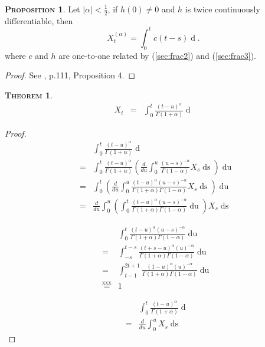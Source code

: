 \documentclass[a4paper, twoside, 11pt]{article}
\theoremstyle{definition}
\newtheorem{theorem}[definition]{\scshape Theorem}
\newtheorem{proposition}[definition]{\scshape Proposition}
\newcommand{\brkt}[1]{\left({#1} \right)}
\begin{document}
\begin{proposition}
  Let $|\alpha| < \frac{1}{2}$, if $h(0) \neq 0$ and $h$ is twice continuously differentiable, then 
  $$X^{(\alpha)}_t = \int_0^t c(t-s) \mathop{dB_s}.$$
  where $c$ and $h$ are one-to-one related by (\ref{sec:frac2}) and (\ref{sec:frac3}).
\end{proposition}
\begin{proof}
  See  \cite{core}, p.111, Proposition 4.
  \end{proof}
  \begin{theorem}
	\begin{eqnarray}
	X_t &=& \int_0^t \frac{(t-u)^\alpha}{\Gamma(1+\alpha)}\mathop{dX^{(\alpha)}_u}
	\label{sec:imp}
  \end{eqnarray}
  \end{theorem}
  \begin{proof}
  \begin{eqnarray*}
	&&\int_0^t \frac{(t-u)^\alpha}{\Gamma(1+\alpha)}\mathop{dX^{(\alpha)}_u}\\
	&=& \int_0^t \frac{(t-u)^\alpha}{\Gamma(1+\alpha)} \brkt{\frac{d}{du} \int_0^u \frac{(u-s)^{-\alpha}}{\Gamma(1-\alpha)}X_s\mathop{ds}}\mathop{du}\\
	&=& \int_0^t \brkt{\frac{d}{du} \int_0^u \frac{(t-u)^\alpha(u-s)^{-\alpha}}{\Gamma(1+\alpha)\Gamma(1-\alpha)}X_s\mathop{ds}}\mathop{du}\\
	&=& \frac{d}{du}\int_0^u \brkt{\int_0^t \frac{(t-u)^\alpha(u-s)^{-\alpha}}{\Gamma(1+\alpha)\Gamma(1-\alpha)}\mathop{du}} X_s \mathop{ds}
  \end{eqnarray*}

  \begin{eqnarray*}
	&&\int_0^t\frac{(t-u)^\alpha(u-s)^{-\alpha}}{\Gamma(1+\alpha)\Gamma(1-\alpha)}\mathop{du}\\
	&=& \int_{-s}^{t-s}\frac{(t+s-u)^\alpha(u)^{-\alpha}}{\Gamma(1+\alpha)\Gamma(1-\alpha)}\mathop{du}\\
	&=& \int_{t-1}^{2t+1}\frac{(1-u)^\alpha(u)^{-\alpha}}{\Gamma(1+\alpha)\Gamma(1-\alpha)}\mathop{du}\\
	&\overset{\text{xxx}}{=}& 1
  \end{eqnarray*}
 
  \begin{eqnarray}
	&&\int_0^t \frac{(t-u)^\alpha}{\Gamma(1+\alpha)}\mathop{dX^{(\alpha)}_u}\nonumber\\
	&=& \frac{d}{du}\int_0^u X_s \mathop{ds}
  \end{eqnarray}
\end{proof}
\end{document}
